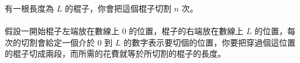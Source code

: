 有一根長度為 $L$ 的棍子，你會把這個棍子切割 $n$ 次。\\
\\
假設一開始棍子左端放在數線上 $0$ 的位置，棍子的右端放在數線上 $L$ 的位置，每次的切割會給定一個介於 $0$ 到 $L$ 的數字表示要切個的位置，你要把穿過個這位置的棍子切成兩段，而所需的花費就等於所切割的棍子的長度。\\
